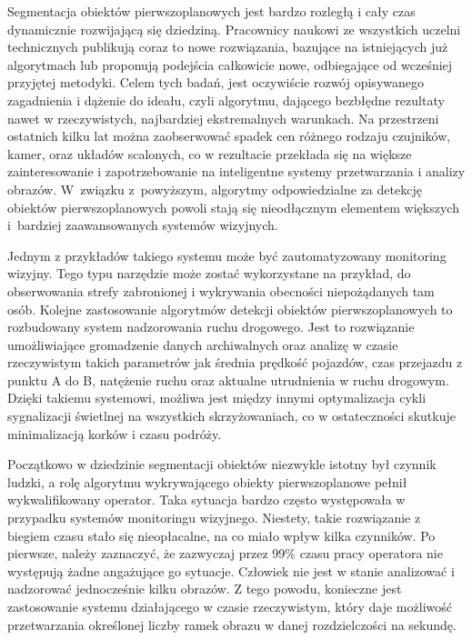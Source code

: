 Segmentacja obiektów pierwszoplanowych jest bardzo rozległą i cały czas dynamicznie rozwijającą się dziedziną. 
Pracownicy naukowi ze wszystkich uczelni technicznych publikują coraz to nowe rozwiązania, bazujące na istniejących już algorytmach lub proponują podejścia całkowicie nowe, odbiegające od wcześniej przyjętej metodyki.  
Celem tych badań, jest oczywiście rozwój opisywanego zagadnienia i dążenie do ideału, czyli algorytmu, dającego bezbłędne rezultaty nawet w rzeczywistych, najbardziej ekstremalnych warunkach. 
Na przestrzeni ostatnich kilku lat można zaobserwować spadek cen różnego rodzaju czujników, kamer, oraz układów scalonych, co w rezultacie przekłada się na większe zainteresowanie i zapotrzebowanie na inteligentne systemy przetwarzania i analizy obrazów. 
W~związku z~powyższym, algorytmy odpowiedzialne za detekcję obiektów pierwszoplanowych powoli stają się nieodłącznym elementem większych i~bardziej zaawansowanych systemów wizyjnych. 

Jednym z przykładów takiego systemu może być zautomatyzowany monitoring wizyjny. 
Tego typu narzędzie może zostać wykorzystane na przykład, do obserwowania strefy zabronionej i wykrywania obecności niepożądanych tam osób. Kolejne zastosowanie algorytmów detekcji obiektów pierwszoplanowych to rozbudowany system nadzorowania ruchu drogowego. Jest to rozwiązanie umożliwiające gromadzenie danych archiwalnych oraz analizę w czasie rzeczywistym takich parametrów jak średnia prędkość pojazdów, czas przejazdu z punktu A do B, natężenie ruchu oraz aktualne utrudnienia w ruchu drogowym. Dzięki takiemu systemowi, możliwa jest między innymi optymalizacja cykli sygnalizacji świetlnej na wszystkich skrzyżowaniach, co w ostateczności skutkuje minimalizacją korków i czasu podróży.   

Początkowo w dziedzinie segmentacji obiektów niezwykle istotny był czynnik ludzki, a rolę algorytmu wykrywającego obiekty pierwszoplanowe pełnił wykwalifikowany operator. Taka sytuacja bardzo często występowała w przypadku systemów monitoringu wizyjnego.
Niestety, takie rozwiązanie z biegiem czasu stało się nieopłacalne, na co miało wpływ kilka czynników. 
Po pierwsze, należy zaznaczyć, że zazwyczaj przez 99\% czasu pracy operatora nie występują żadne angażujące go sytuacje. 
Człowiek nie jest w stanie analizować i nadzorować jednocześnie kilku obrazów. 
Z tego powodu, konieczne jest zastosowanie systemu działającego w czasie rzeczywistym, który daje możliwość przetwarzania określonej liczby ramek obrazu w danej rozdzielczości na sekundę.

